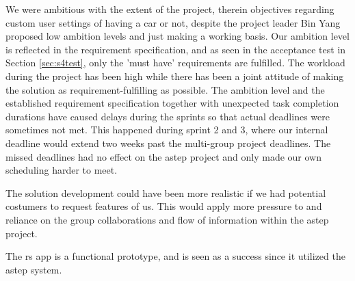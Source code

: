 We were ambitious with the extent of the project, therein objectives regarding custom user settings of having a car or not, despite the project leader Bin Yang proposed low ambition levels and just making a working basis.
Our ambition level is reflected in the requirement specification, and as seen in the acceptance test in Section \ref{sec:s4test}, only the 'must have' requirements are fulfilled.
The workload during the project has been high while there has been a joint attitude of making the solution as requirement-fulfilling as possible.
The ambition level and the established requirement specification together with unexpected task completion durations have caused delays during the sprints so that actual deadlines were sometimes not met.
This happened during sprint 2 and 3, where our internal deadline would extend two weeks past the multi-group project deadlines.
The missed deadlines had no effect on the \gls{astep} project and only made our own scheduling harder to meet.

The solution development could have been more realistic if we had potential costumers to request features of us.
This would apply more pressure to and reliance on the group collaborations and flow of information within the \gls{astep} project.

The \gls{rs} app is a functional prototype, and is seen as a success since it utilized the \gls{astep} system.


